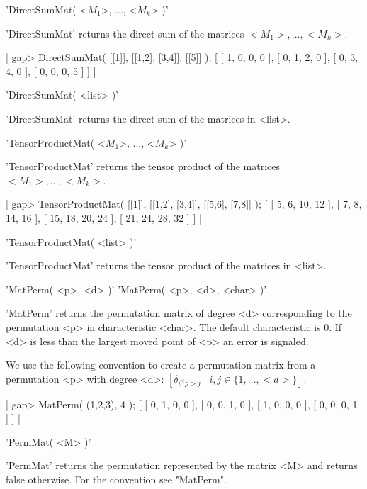 
'DirectSumMat( <$M_1$>, ..., <$M_k$> )'

'DirectSumMat' returns the direct sum of the matrices 
$<M_1>, ..., <M_k>$.

|    gap> DirectSumMat( [[1]], [[1,2], [3,4]], [[5]] );
    [ [ 1, 0, 0, 0 ], [ 0, 1, 2, 0 ], [ 0, 3, 4, 0 ], [ 0, 0, 0, 5 ] ] |

'DirectSumMat( <list> )'

'DirectSumMat' returns the direct sum of the matrices
in <list>.


'TensorProductMat( <$M_1$>, ..., <$M_k$> )'

'TensorProductMat' returns the tensor product of the matrices 
$<M_1>, ..., <M_k>$.

|    gap> TensorProductMat( [[1]], [[1,2], [3,4]], [[5,6], [7,8]] );
    [ [ 5, 6, 10, 12 ], [ 7, 8, 14, 16 ], 
      [ 15, 18, 20, 24 ], [ 21, 24, 28, 32 ] ] |

'TensorProductMat( <list> )'

'TensorProductMat' returns the tensor product of the matrices
in <list>.


'MatPerm( <p>, <d> )'
'MatPerm( <p>, <d>, <char> )'

'MatPerm' returns the permutation matrix of degree <d> 
corresponding to the permutation <p> in characteristic <char>.
The default characteristic is 0. If <d> is less than the largest
moved point of <p> an error is signaled. 

We use the following convention to create a permutation 
matrix from a permutation <p> with degree <d>: 
$[\delta_{i^<p>j}\mid i,j\in\{1,\dots,<d>\}]$.

|    gap> MatPerm( (1,2,3), 4 );
    [ [ 0, 1, 0, 0 ], [ 0, 0, 1, 0 ], [ 1, 0, 0, 0 ], [ 0, 0, 0, 1 ] ] |


'PermMat( <M> )'

'PermMat' returns the permutation represented by the matrix <M>
and returns false otherwise. For the convention see "MatPerm".

